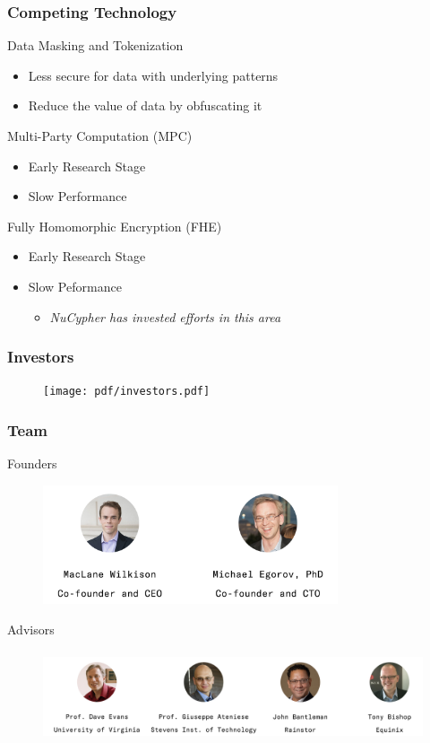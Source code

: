 \documentclass[xetex,mathsans,sans,aspectratio=169]{beamer}
\begin{document}
    \begin{frame}
      \frametitle{Competing Technology}
       Data Masking and Tokenization
       \begin{itemize}
           \item Less secure for data with underlying patterns
           \item Reduce the value of data by obfuscating it
       \end{itemize}

       Multi-Party Computation (MPC)
       \begin{itemize}
           \item Early Research Stage
           \item Slow Performance
       \end{itemize}
      
       Fully Homomorphic Encryption (FHE)
       \begin{itemize}
           \item Early Research Stage
           \item Slow Peformance
           \begin{itemize}
               \item \emph{NuCypher has invested efforts in this area}
           \end{itemize}
       \end{itemize}
       
     \end{frame}
    
    \begin{frame}
      \frametitle{Investors}
        \begin{figure}
            \centering
            \texttt{[image: pdf/investors.pdf]}
        \end{figure}
    \end{frame}

    \begin{frame}
      \frametitle{Team}
        Founders
        \begin{figure}
            \centering
            \includegraphics[height=3.5cm]{pdf/founders-from-website.pdf}
        \end{figure}
        Advisors
        \begin{figure}
            \centering
            \includegraphics[height=2.7cm]{pdf/advisors-from-website.pdf}
        \end{figure}
    \end{frame}
    
\end{document}
